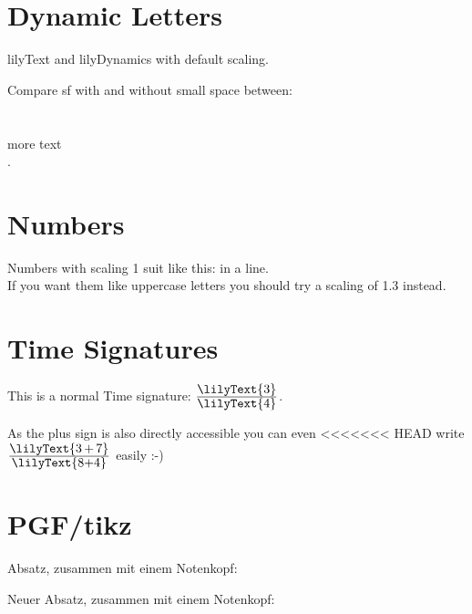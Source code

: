 \documentclass{scrartcl}
\newcommand*{\lilyTimeSignature}[2]{$\frac{\mbox{\lilyText{#1}}}{\mbox{\lilyText{#2}}}$}
\begin{document}
\section*{Dynamic Letters}
{	\LARGE
}	
	
	lilyText  and lilyDynamics  with default scaling.
	
	Compare sf with and without small space between:\\
	\\
	\\
	\lilyRF* more text\\
	\lilyRFZ.
	
\section*{Numbers}
Numbers with scaling 1 suit like this:  in a line.\\
If you want them like uppercase letters you should try a scaling of  1.3 instead.

\section*{Time Signatures}
	This is a normal Time signature: \lilyTimeSignature{3}{4}.
	
	As the plus sign is also directly accessible you can even
<<<<<<< HEAD
	write \lilyTimeSignature{3\,+\,7}{8+4} easily :-)

	
\section*{PGF/tikz}

Absatz, zusammen mit einem Notenkopf: 

\Large
Neuer Absatz, zusammen mit einem Notenkopf: 
\end{document}
